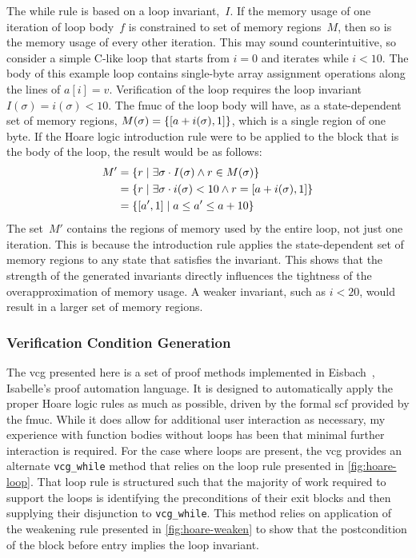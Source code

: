 The while rule is based on a loop invariant,~$I$.
If the memory usage of one iteration of loop body~$f$
is constrained to set of memory regions~$M$,
then so is the memory usage of every other iteration.
This may sound counterintuitive,
so consider a simple C-like loop that starts from $i=0$ and iterates while $i<10$.
The body of this example loop contains single-byte array assignment operations
along the lines of $a[i]=v$.
Verification of the loop requires the loop invariant $I(\sigma)=i(\sigma)<10$.
The \ac{fmuc} of the loop body will have, as a state-dependent set of memory regions, $M(\sigma)=\{[a+i(\sigma),1]\}$, which is a single region of one byte.
If the Hoare logic introduction rule were to be applied to the block
that is the body of the loop, the result would be as follows:
\begin{subequations}
  \begin{align}
    M' &= \{r\mid\exists\sigma\cdot I(\sigma)\wedge r\in M(\sigma)\} \\
    &= \{r\mid\exists\sigma\cdot i(\sigma)<10\wedge r=[a+i(\sigma),1]\} \\
    &= \{[a',1]\mid a\leq a'\le a+10\}
  \end{align}
\end{subequations}
The set~$M'$ contains the regions of memory used by the entire loop,
not just one iteration.
This is because the introduction rule applies the state-dependent set of memory regions
to any state that satisfies the invariant.
This shows that the strength of the generated invariants directly influences the tightness of the overapproximation of memory usage.
A weaker invariant, such as $i<20$, would result in a larger set of memory regions.

\subsubsection{Verification Condition Generation}\label{sse:vcg}
The \ac{vcg} presented here is a set of proof methods
implemented in Eisbach~\citep{matichuk2016eisbach},
Isabelle's proof automation language.
It is designed to automatically apply the proper Hoare logic rules
as much as possible,
driven by the formal \ac{scf} provided by the \ac{fmuc}.
While it does allow for additional user interaction as necessary,
my experience with function bodies without loops
has been that minimal further interaction is required.
For the case where loops are present,
the \ac{vcg} provides an alternate \lstinline|vcg_while| method
that relies on the loop rule presented in \cref{fig:hoare-loop}.
That loop rule is structured such that
the majority of work required to support the loops
is identifying the preconditions of their exit blocks
and then supplying their disjunction to \lstinline|vcg_while|.
This method relies on application of the weakening rule
presented in \cref{fig:hoare-weaken}
to show that the postcondition of the block before entry implies the loop invariant.


